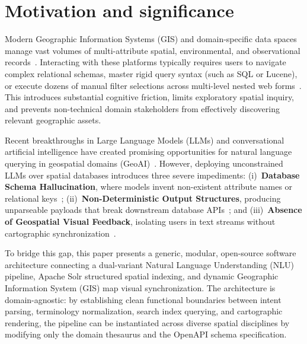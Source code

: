 \section{Motivation and significance}
\label{sec:MotivationAndSignificance}

Modern Geographic Information Systems (GIS) and domain-specific data spaces manage vast volumes of multi-attribute spatial, environmental, and observational records~\cite{curry2022data}. Interacting with these platforms typically requires users to navigate complex relational schemas, master rigid query syntax (such as SQL or Lucene), or execute dozens of manual filter selections across multi-level nested web forms~\cite{huang2022natural, dou2024survey}. This introduces substantial cognitive friction, limits exploratory spatial inquiry, and prevents non-technical domain stakeholders from effectively discovering relevant geographic assets.

Recent breakthroughs in Large Language Models (LLMs) and conversational artificial intelligence have created promising opportunities for natural language querying in geospatial domains (GeoAI)~\cite{janowicz2020geoai, mai2023opportunities, li2023geollm}. However, deploying unconstrained LLMs over spatial databases introduces three severe impediments: (i)~\textbf{Database Schema Hallucination}, where models invent non-existent attribute names or relational keys~\cite{dou2024survey, willard2023outlines}; (ii)~\textbf{Non-Deterministic Output Structures}, producing unparseable payloads that break downstream database APIs~\cite{willard2023outlines, pydantic2023}; and (iii)~\textbf{Absence of Geospatial Visual Feedback}, isolating users in text streams without cartographic synchronization~\cite{scheider2021question, huang2022natural}.

To bridge this gap, this paper presents a generic, modular, open-source software architecture connecting a dual-variant Natural Language Understanding (NLU) pipeline, Apache Solr structured spatial indexing, and dynamic Geographic Information System (GIS) map visual synchronization. The architecture is domain-agnostic: by establishing clean functional boundaries between intent parsing, terminology normalization, search index querying, and cartographic rendering, the pipeline can be instantiated across diverse spatial disciplines by modifying only the domain thesaurus and the OpenAPI schema specification.

